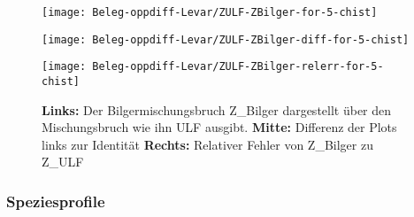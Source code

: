 
\begin{figure}[H]
    \begin{minipage}{0.33\linewidth}\begin{center}
        \texttt{[image: Beleg-oppdiff-Levar/ZULF-ZBilger-for-5-chist]}
    \end{center}\end{minipage}\begin{minipage}{0.33\linewidth}\begin{center}
        \texttt{[image: Beleg-oppdiff-Levar/ZULF-ZBilger-diff-for-5-chist]}
    \end{center}\end{minipage}\begin{minipage}{0.33\linewidth}\begin{center}
        \texttt{[image: Beleg-oppdiff-Levar/ZULF-ZBilger-relerr-for-5-chist]}
    \end{center}\end{minipage}
    \caption{
        \textbf{Links:} Der Bilgermischungsbruch \gls{Z_Bilger} dargestellt über den Mischungsbruch wie ihn \gls{ULF} ausgibt.
        \textbf{Mitte:} Differenz der Plots links zur Identität
        \textbf{Rechts:} Relativer Fehler von \gls{Z_Bilger} zu \gls{Z_ULF}
    }
    \label{fig:opplevar:zbilger-zcalc}
\end{figure}

\subsubsection{Speziesprofile}

